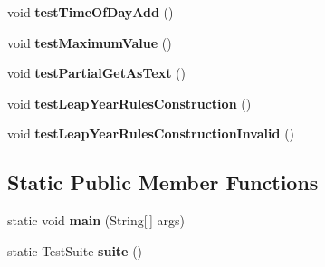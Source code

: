 \begin{DoxyCompactItemize}
\item 
\hypertarget{classorg_1_1joda_1_1time_1_1chrono_1_1_test_g_j_chronology_a01a499f05ced188f86098ea7cd9b76ad}{void {\bfseries test\-Time\-Of\-Day\-Add} ()}\label{classorg_1_1joda_1_1time_1_1chrono_1_1_test_g_j_chronology_a01a499f05ced188f86098ea7cd9b76ad}

\item 
\hypertarget{classorg_1_1joda_1_1time_1_1chrono_1_1_test_g_j_chronology_a2b7b8a9eb1d70ca2cb49b2a9d6c027b8}{void {\bfseries test\-Maximum\-Value} ()}\label{classorg_1_1joda_1_1time_1_1chrono_1_1_test_g_j_chronology_a2b7b8a9eb1d70ca2cb49b2a9d6c027b8}

\item 
\hypertarget{classorg_1_1joda_1_1time_1_1chrono_1_1_test_g_j_chronology_ac1144c3f67fde5b5976a4e42439219e0}{void {\bfseries test\-Partial\-Get\-As\-Text} ()}\label{classorg_1_1joda_1_1time_1_1chrono_1_1_test_g_j_chronology_ac1144c3f67fde5b5976a4e42439219e0}

\item 
\hypertarget{classorg_1_1joda_1_1time_1_1chrono_1_1_test_g_j_chronology_aa98ccac8265e32577c54c5065a0aabf7}{void {\bfseries test\-Leap\-Year\-Rules\-Construction} ()}\label{classorg_1_1joda_1_1time_1_1chrono_1_1_test_g_j_chronology_aa98ccac8265e32577c54c5065a0aabf7}

\item 
\hypertarget{classorg_1_1joda_1_1time_1_1chrono_1_1_test_g_j_chronology_ae3a3c91af90bc1cd5b4e2a68d3bf3953}{void {\bfseries test\-Leap\-Year\-Rules\-Construction\-Invalid} ()}\label{classorg_1_1joda_1_1time_1_1chrono_1_1_test_g_j_chronology_ae3a3c91af90bc1cd5b4e2a68d3bf3953}

\end{DoxyCompactItemize}
\subsection*{Static Public Member Functions}
\begin{DoxyCompactItemize}
\item 
\hypertarget{classorg_1_1joda_1_1time_1_1chrono_1_1_test_g_j_chronology_a13a9f199809573b9dda2892d80ba67f6}{static void {\bfseries main} (String\mbox{[}$\,$\mbox{]} args)}\label{classorg_1_1joda_1_1time_1_1chrono_1_1_test_g_j_chronology_a13a9f199809573b9dda2892d80ba67f6}

\item 
\hypertarget{classorg_1_1joda_1_1time_1_1chrono_1_1_test_g_j_chronology_afd4b52a94ff62076e63b0d55c3396ddc}{static Test\-Suite {\bfseries suite} ()}\label{classorg_1_1joda_1_1time_1_1chrono_1_1_test_g_j_chronology_afd4b52a94ff62076e63b0d55c3396ddc}

\end{DoxyCompactItemize}
